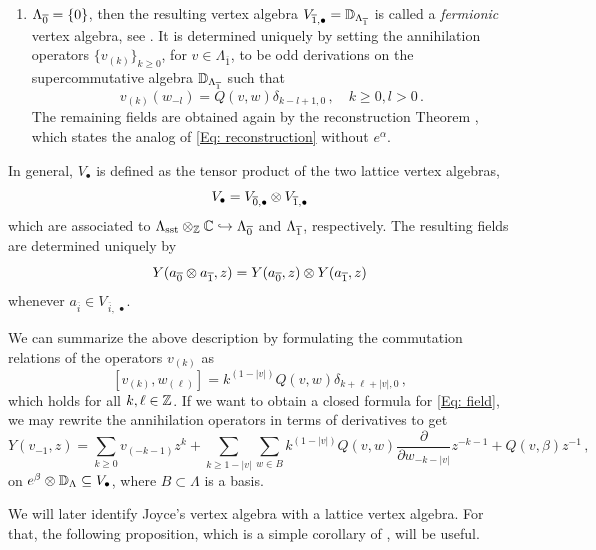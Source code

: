 \documentclass[a4paper, 12pt]{amsart}
\begin{document}
\begin{definition}
\begin{enumerate}
\begin{multline}
\end{multline}
\item  $\Lambda_{\overline{0}} = \{0\}$, then the resulting vertex algebra $V_{\overline{1}, \bullet}={\mathbb{D}}_{\Lambda_{\overline 1}}$ is called a \textit{fermionic} vertex algebra, see \cite[Section 3.6]{Ka98}. It is determined uniquely by setting the annihilation operators $\{v_{(k)}\}_{k\geq 0}$, for $v\in \Lambda_{\overline 1}$, to be odd derivations on the supercommutative algebra ${\mathbb{D}}_{\Lambda_{\overline 1}}$ such that 
$$
v_{(k)}(w_{-l}) =Q(v,w)\delta_{k-l+1,0}\,, \quad k\geq 0, l>0 \,.
$$
The remaining fields are obtained again by the reconstruction Theorem \cite[Theorem 4.5]{Ka98}, which states the analog of \eqref{Eq: reconstruction} without $e^\alpha$.
    \end{enumerate}
  In general, $V_\bullet$ is defined as the tensor product of the two lattice vertex algebras, \[V_\bullet=V_{\overline{0}, \bullet}\otimes V_{\overline{1},\bullet} \]
   which are associated to $\Lambda_{\text{sst}}\otimes_{{\mathbb{Z}}}{\mathbb{C}}\hookrightarrow \Lambda_{\overline 0}$ and $\Lambda_{\overline{1}}$, respectively. The resulting fields are determined uniquely by
$$
Y({a_{\overline{0}}\otimes a_{\overline{1}}},z) = Y(a_{\overline{0}},z)\otimes Y(a_{\overline{1}},z)
$$
whenever $a_{\overline{i}}\in V_{\,\overline{i},\,\bullet}$.
\end{definition}

We can summarize the above description by formulating the commutation relations of the operators $v_{(k)}$ as
\begin{equation}\label{lattice VOA commutation}
    [v_{(k)},w_{(\ell)}]=k^{(1-|v|)}Q(v,w)\delta_{k+\ell+|v|,0}\,,
\end{equation}
which holds for all $k,\ell\in {\mathbb{Z}}$. If we want to obtain a closed formula for \eqref{Eq: field}, we may rewrite the annihilation operators in terms of derivatives to get
\begin{equation}
\label{Eq: explicitfield}
Y(v_{-1},z) = \sum_{k\geq0}v_{(-k-1)}z^{k} +\sum_{k\geq 1-|v|}\sum_{w\in B} k^{(1-|v|)} Q(v,w)\frac{\partial}{\partial w_{-k-|v|}}z^{-k-1} + Q(v,\beta)z^{-1}\,,
\end{equation}
on $e^\beta\otimes {\mathbb{D}}_\Lambda\subseteq V_\bullet$, where $B\subset\Lambda$ is a basis. 

We will later identify Joyce's vertex algebra with a lattice vertex algebra. For that, the following proposition, which is a simple corollary of \cite[Proposition 5.4]{Ka98}, will be useful. 
\end{document}
